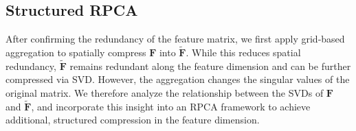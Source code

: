 \documentclass[runningheads]{llncs}
\begin{document}
\subsection{Structured RPCA}
After confirming the redundancy of the feature matrix, we first apply grid‑based aggregation to spatially compress $\mathbf{F}$ into $\tilde{\mathbf{F}}$. While this reduces spatial redundancy, $\tilde{\mathbf{F}}$ remains redundant along the feature dimension and can be further compressed via SVD. However, the aggregation changes the singular values of the original matrix. We therefore analyze the relationship between the SVDs of $\mathbf{F}$ and $\tilde{\mathbf{F}}$, and incorporate this insight into an RPCA framework to achieve additional, structured compression in the feature dimension.
\end{document}

